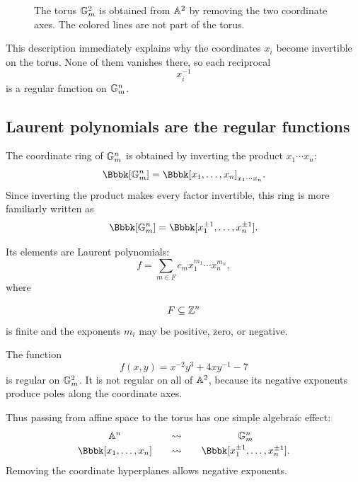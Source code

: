 \begin{figure}[ht]
\centering
{}
\caption{The torus \(\mathbb{G}_{m}^2\) is obtained from \(\mathbb{A}^2\) by removing
the two coordinate axes. The colored lines are not part of the torus.}
\label{fig:gm2-complement-coordinate-axes}
\end{figure}

This description immediately explains why the coordinates \(x_i\)
become invertible on the torus. None of them vanishes there, so each
reciprocal
\[
x_i^{-1}
\]
is a regular function on \(\mathbb{G}_{m}^n\).

\subsection{Laurent polynomials are the regular functions}

The coordinate ring of \(\mathbb{G}_{m}^n\) is obtained by inverting the product
\(x_1\cdots x_n\):
\[
\Bbbk[\Gm^n]
=
\Bbbk[x_1,\ldots,x_n]_{x_1\cdots x_n}.
\]
Since inverting the product makes every factor invertible, this ring is
more familiarly written as
\[
\Bbbk[\Gm^n]
=
\Bbbk[x_1^{\pm1},\ldots,x_n^{\pm1}].
\]

Its elements are Laurent polynomials:
\[
f
=
\sum_{m\in F} c_m x_1^{m_1}\cdots x_n^{m_n},
\]
where

\[
F\subseteq\mathbb{Z}^n
\]
is finite and the exponents \(m_i\) may be positive, zero, or negative.

\begin{example}
The function
\[
f(x,y)=x^{-2}y^3+4xy^{-1}-7
\]
is regular on \(\mathbb{G}_{m}^2\). It is not regular on all of \(\mathbb{A}^2\),
because its negative exponents produce poles along the coordinate
axes.
\end{example}

Thus passing from affine space to the torus has one simple algebraic
effect:
\[
\begin{array}{c@{\qquad\rightsquigarrow\qquad}c}
\AAA^n & \Gm^n\\[1mm]
\Bbbk[x_1,\ldots,x_n]
&
\Bbbk[x_1^{\pm1},\ldots,x_n^{\pm1}].
\end{array}
\]
Removing the coordinate hyperplanes allows negative exponents.

